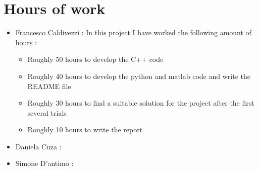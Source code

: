\section{Hours of work}
    \begin{itemize}
        \item Francesco Caldivezzi : In this project I have worked the following amount of hours : 
        \begin{itemize}
            \item Roughly 50 hours to develop the C++ code
            \item Roughly 40 hours to develop the python and matlab code and write the README file
            \item Roughly 30 hours to find a suitable solution for the project after the first several trials
            \item Roughly 10 hours to write the report
        \end{itemize}
        \item Daniela Cuza : 
        \item Simone D'antimo :
    \end{itemize}